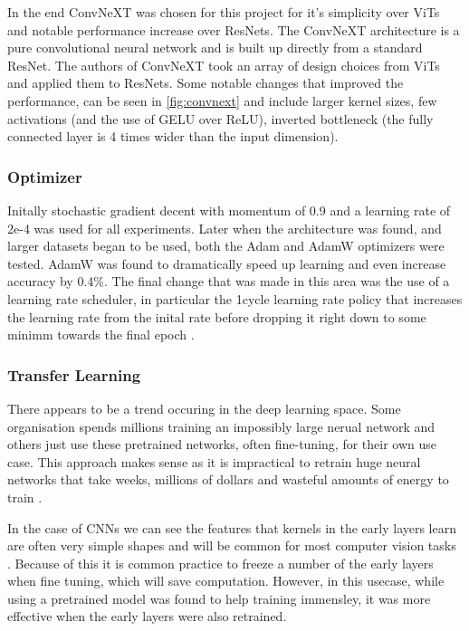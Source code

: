 In the end ConvNeXT was chosen for this project for it's simplicity over ViTs and notable performance increase over ResNets.  The ConvNeXT architecture is a pure 
convolutional neural network and is built up directly from a standard ResNet.  
The authors of ConvNeXT took an array of design choices from ViTs and applied them to ResNets.  
Some notable changes that improved the performance, can be seen in \ref{fig:convnext} and include
larger kernel sizes, few activations (and the use of GELU over ReLU), inverted bottleneck (the fully connected layer is 4 times wider than the input dimension).

\subsubsection{Optimizer}
Initally stochastic gradient decent with momentum of 0.9 and a learning rate of 2e-4 was used for all experiments.  Later when the architecture 
was found, and larger datasets began to be used, both the Adam and AdamW optimizers were tested.  
AdamW was found to dramatically speed up learning and even increase 
accuracy by 0.4\%.  The final change that was made in this area was the use of a learning rate scheduler, in particular the 1cycle learning rate policy that 
increases the learning rate from the inital rate before dropping it right down to some minimm towards the final epoch \cite{smith2019super}.

\subsubsection{Transfer Learning}
There appears to be a trend occuring in the deep learning space.  Some organisation spends millions training an impossibly large nerual network
and others just use these pretrained networks, often fine-tuning, for their own use case.
This approach makes sense as it is impractical to retrain huge neural networks that take weeks, millions of dollars and wasteful amounts of energy
to train \cite{silver2018general}.

In the case of CNNs we can see the features that kernels in the early layers learn are often very simple shapes and will be common for most
computer vision tasks \cite{simonyan2013deep}.  
Because of this it is common practice to freeze a number of the early layers when fine tuning, which will save computation. 
However, in this usecase, while using a pretrained model was found to help training immensley, it was more effective when the early 
layers were also retrained.

